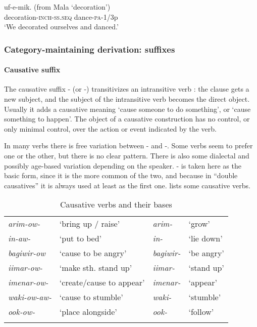 \ea%
\label{ex:3:x488}
\gll {} uf-e-mik. (from Mala  `decoration') \\
decoration-\textsc{inch}-\textsc{ss}.\textsc{seq} dance-\textsc{pa}-1/3p\\
\glt`We decorated ourselves and danced.'
\z

\subsubsection{Category-maintaining derivation: suffixes}
{}
\paragraph{Causative suffix}\label{sec:3.8.2.3.1}
{}
The causative suffix \nobreakdash- (or \nobreakdash-) transitivizes an intransitive verb \citep[2]{Peterson2007}: the clause gets a new subject, and the subject of the intransitive verb becomes the direct object. Usually it adds a causative meaning `cause someone to do something', or `cause something to happen'. The object of a causative construction has no control, or only minimal control, over the action or event indicated by the verb.

In many verbs there is free variation between \nobreakdash- and \nobreakdash-. Some verbs seem to prefer one or the other, but there is no clear pattern. There is also some dialectal and possibly age-based variation depending on the speaker. \nobreakdash- is taken here as the basic form, since it is the more common of the two, and because in ``double causatives'' it is always used at least as the first one.  lists some causative verbs.

\begin{table}
\caption{Causative verbs and their bases}
\label{tab:3:causverbsnbases}

\begin{tabular}{>{\itshape}ll>{\itshape}ll}
\mytoprule
arim-ow- &`bring up / raise' &arim- &`grow'\\
in-aw- &`put to bed' &in- &`lie down'\\
bagiwir-ow &`cause to be angry' &bagiwir- &`be angry'\\
iimar-ow- &`make sth. stand up' &iimar- &`stand up'\\
imenar-ow- &`create/cause to appear' &imenar- &`appear'\\
waki-ow-aw- &`cause to stumble' &waki- &`stumble'\\
ook-ow- &`place alongside' &ook- &`follow'\\
\mybottomrule
\end{tabular}
\end{table}

